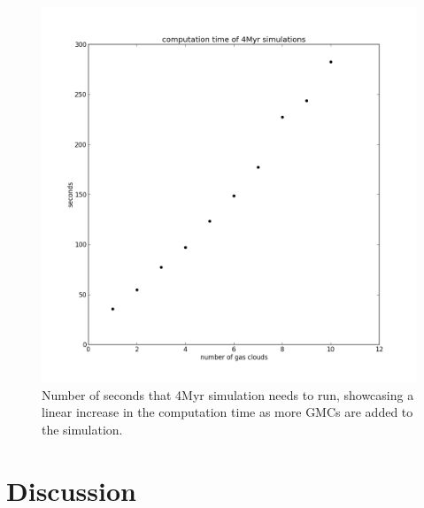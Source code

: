 \documentclass{aa}
\begin{document}
\begin{figure}
    \centering
    \includegraphics[width=\hsize]{img/multi_gmc_timings.png}
    \caption{Number of seconds that 4Myr simulation needs to run, showcasing a linear increase in the computation time as more GMCs are added to the simulation.}\label{fig:multi_GMCs_timings}
\end{figure}






\section{Discussion}\label{sec:discussion}
\end{document}
